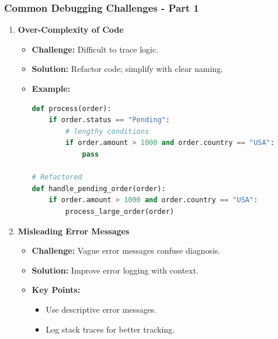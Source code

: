 \documentclass{beamer}
\begin{document}
\begin{frame}[fragile]
    \frametitle{Common Debugging Challenges - Part 1}
    \begin{enumerate}
        \item \textbf{Over-Complexity of Code}
            \begin{itemize}
                \item \textbf{Challenge:} Difficult to trace logic.
                \item \textbf{Solution:} Refactor code; simplify with clear naming.
                \item \textbf{Example:} 
                \begin{lstlisting}[language=Python]
def process(order):
    if order.status == "Pending":
        # lengthy conditions
        if order.amount > 1000 and order.country == "USA":
            pass

# Refactored
def handle_pending_order(order):
    if order.amount > 1000 and order.country == "USA":
        process_large_order(order)
                \end{lstlisting}
            \end{itemize}
        
        \item \textbf{Misleading Error Messages}
            \begin{itemize}
                \item \textbf{Challenge:} Vague error messages confuse diagnosis.
                \item \textbf{Solution:} Improve error logging with context.
                \item \textbf{Key Points:}
                    \begin{itemize}
                        \item Use descriptive error messages.
                        \item Log stack traces for better tracking.
                    \end{itemize}
            \end{itemize}
    \end{enumerate}
\end{frame}
\end{document}
